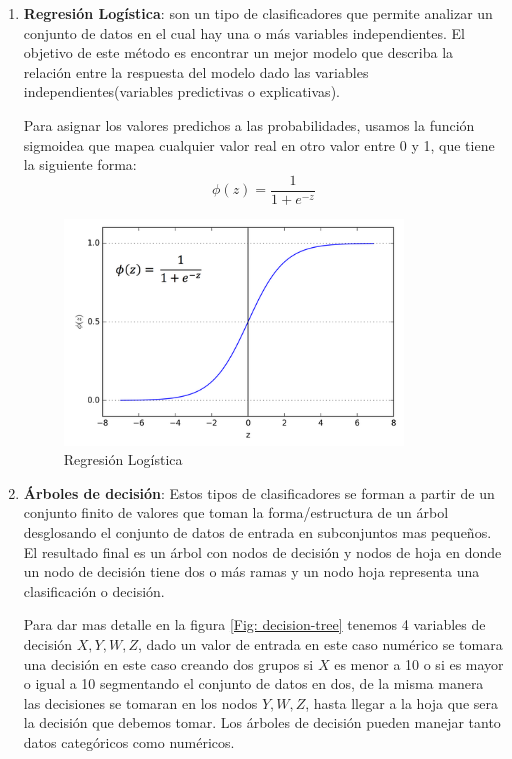 \begin{enumerate}
\item \textbf{Regresión Logística}: son un tipo de clasificadores que permite analizar un conjunto de datos en el cual hay una o más variables independientes. El objetivo de este método es encontrar un mejor modelo que describa la relación entre la respuesta del modelo dado las variables independientes(variables predictivas o explicativas). 

Para asignar los valores predichos a las probabilidades, usamos la función sigmoidea que mapea cualquier valor real en otro valor entre 0 y 1, que tiene la siguiente forma:
\begin{equation}
\phi(z) = \frac{1}{1+e^{-z}}
\end{equation}

\begin{figure}[H]
 \centering
  \includegraphics[height=6cm,keepaspectratio=true,clip=true]{imagenes/MarcoTeorico/sigmoide.png}
  \caption{Regresión Logística}
  \label{Fig: log_reg}
\end{figure}


\item \textbf{Árboles de decisión}: Estos tipos de clasificadores se forman a partir de  un conjunto finito de valores  que toman la forma/estructura de un árbol desglosando el conjunto de datos de entrada en subconjuntos mas pequeños. El resultado final es un árbol con nodos de decisión y nodos de hoja en donde un nodo de decisión tiene dos o más ramas y un nodo hoja representa una clasificación o decisión. 

Para dar mas detalle en la figura \ref{Fig: decision-tree} tenemos 4 variables de decisión $ X, Y, W, Z$, dado un valor  de entrada en este caso numérico se tomara una decisión en este caso creando dos grupos  si $ X$  es menor a 10 o si es mayor o igual a 10 segmentando el conjunto de datos en dos, de la misma manera las decisiones se tomaran en los nodos $ Y, W, Z$, hasta llegar a la hoja que sera la decisión que debemos tomar. Los árboles de decisión pueden manejar tanto datos categóricos como numéricos.


\end{enumerate}
